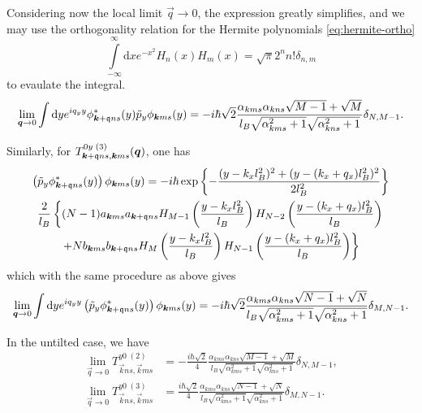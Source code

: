 Considering now the local limit \( \vec{q} \to 0 \), the expression greatly simplifies, and we may use the orthogonality relation for the Hermite polynomials \cref{eq:hermite-ortho}
\[
  \int\limits_{-\infty}^{\infty} \mathrm{d}x e^{-x^2} H_n(x)H_m(x) = \sqrt{\pi} 2^{n} n! \delta_{n,m}
\]
to evaulate the integral.
\begin{equation}
  \label{eq:146}
  \lim_{\bm{q} \to 0} \int \mathrm{d}y e^{iq_y y} \phi ^{*}_{\bm{k}+\mathfrak{q} ns}(y) \tilde{p}_y \phi _{\bm{k} ms}(y) =
  -i \hbar \sqrt{2}
  \frac{
    \alpha_{k m s} \alpha_{k n s} \sqrt{M-1}
    +
    \sqrt{M}
  }{
    {l_{B} \sqrt{\alpha_{k m s}^2 + 1}\sqrt{\alpha_{k n s} ^2 + 1}}
  }
  \delta_{N, M-1}.
\end{equation}

Similarly, for $T^{0y\; (3)}_{\bm{k}+\mathfrak{q}ns, \bm{k}ms} (\bm{q})$, one has
\begin{multline}
  \left( \tilde{p}_y \phi ^{*}_{\bm{k}+\mathfrak{q} ns}(y) \right)
  \phi _{\bm{k} m s}(y) =
  -i \hbar \exp \left\{
    - \frac{(y-k_xl_B^2)^2 + (y-(k_x + q_x) l_B^2)^2}{2 l_B^2}
  \right\}\\
  \frac{2}{l_{B}} \left\{
    (N-1) a_{\bm{k} m s} a_{\bm{k} + \mathfrak{q} n s} H_{M-1} \left( \frac{y-k_xl_B^2}{l_B} \right)H_{N-2} \left( \frac{y - (k_x + q_x) l_B^2}{l_B} \right) \right.\\
  \left. +
    N b_{\bm{k} m s} b_{\bm{k}+\mathfrak{q} n s} H_M \left( \frac{y - k_xl_B^2}{l_B} \right) H_{N-1}\left( \frac{y-(k_x+q_x) l_B^2}{l_B} \right)
  \right\}
\end{multline}
which with the same procedure as above gives
\begin{equation}
 \lim_{\bm{q}\to 0} \int \mathrm{d}y e^{iq_y y}
  \left( \tilde{p}_y \phi ^{*}_{\bm{k}+\mathfrak{q} ns}(y) \right)
  \phi _{\bm{k} m s}(y)
  =
  -i \hbar \sqrt{2}
  \frac{
    \alpha_{k m s} \alpha_{k n s} \sqrt{N-1}
    +
    \sqrt{N}
  }{
    {l_{B} \sqrt{\alpha_{k m s}^2 + 1}\sqrt{\alpha_{k n s} ^2 + 1}}
  }
  \delta_{M, N-1}.
\end{equation}

\begin{summary}\label{summary:notilt-otherterm}%
  In the untilted case, we have
  \begin{align}
    \label{eq:71}
    \lim_{\vec{q} \to 0} T^{y0\; (2)}_{\vec{k} n s, \vec{k} m s} &= -\frac{i \hbar \sqrt{2}}{4}
        \frac{
          \alpha_{k m s} \alpha_{k n s} \sqrt{M-1}
          +
          \sqrt{M}
        }{
          {l_{B} \sqrt{\alpha_{k m s}^2 + 1}\sqrt{\alpha_{k n s} ^2 + 1}}
        }
                                                                   \delta_{N, M-1},\\
    \lim_{\vec{q} \to 0} T^{y0\; (3)}_{\vec{k} n s, \vec{k} m s} &= \frac{i \hbar \sqrt{2}}{4}
        \frac{
          \alpha_{k m s} \alpha_{k n s} \sqrt{N-1}
          +
          \sqrt{N}
        }{
          {l_{B} \sqrt{\alpha_{k m s}^2 + 1}\sqrt{\alpha_{k n s} ^2 + 1}}
        }
                                                                   \delta_{M, N-1}.
  \end{align}
\end{summary}


